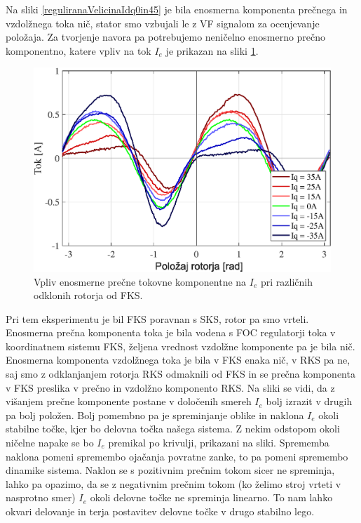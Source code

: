 \documentclass[a4paper,twoside,openright,12pt,slovene]{book}
\begin{document}
Na sliki \ref{reguliranaVelicinaIdq0in45} je bila enosmerna komponenta prečnega in vzdolžnega toka nič, stator smo vzbujali le z VF signalom za ocenjevanje položaja. Za tvorjenje navora pa potrebujemo
neničelno enosmerno prečno komponentno, katere vpliv na tok $I_e$ je prikazan na sliki \ref{reguliranaVelicinaIs}. 
\newline
\begin{figure}[!htbp]
    \centering
    \includegraphics[width=0.85\columnwidth]{Slike/reguliranaVelicinaIs.eps}
    \caption{\label{reguliranaVelicinaIs} Vpliv enosmerne prečne tokovne komponentne na $I_e$ pri različnih odklonih rotorja od FKS.}
\end{figure}

Pri tem eksperimentu je bil FKS poravnan s SKS, rotor pa smo vrteli. Enosmerna prečna komponenta toka je bila vodena s FOC regulatorji toka v koordinatnem sistemu FKS, željena vrednost vzdolžne
komponente pa je bila nič. Enosmerna komponenta vzdolžnega toka je bila v FKS enaka nič, v RKS pa ne, saj smo z odklanjanjem rotorja RKS odmaknili od FKS in se prečna komponenta v FKS preslika v
prečno in vzdolžno komponento RKS. Na sliki se vidi, da z višanjem prečne komponente postane v določenih smereh $I_e$ bolj izrazit v drugih pa bolj položen. Bolj pomembno pa je spreminjanje oblike in
naklona $I_e$ okoli stabilne točke, kjer bo delovna točka našega sistema. Z nekim odstopom okoli ničelne napake se bo $I_e$ premikal po krivulji, prikazani na sliki. Sprememba naklona pomeni spremembo
ojačanja povratne zanke, to pa pomeni spremembo dinamike sistema. Naklon se s pozitivnim prečnim tokom sicer ne spreminja, lahko pa opazimo, da se z negativnim prečnim tokom (ko želimo stroj vrteti v
nasprotno smer) $I_e$ okoli delovne točke ne spreminja linearno. To nam lahko okvari delovanje in terja postavitev delovne točke v drugo stabilno lego.
\end{document}
